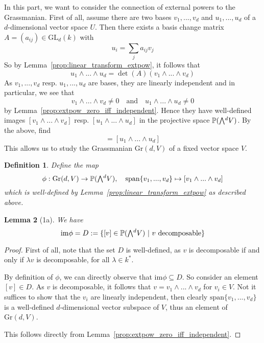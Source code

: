 \documentclass{scrartcl}
\newcommand{\Proj}{\mathbb{P}}
\newcommand{\GL}{\mathrm{GL}}
\newcommand{\Gr}{\mathrm{Gr}}
\newcommand{\extpow}{\mathchoice{{\textstyle\bigwedge}}
    {{\bigwedge}}
    {{\textstyle\wedge}}
    {{\scriptstyle\wedge}}}
\newcommand{\vspan}{\mathrm{span}}
\newtheorem{definition}{Definition}
\newtheorem{lemma}[definition]{Lemma}
\begin{document}
In this part, we want to consider the connection of external powers to the Grassmanian.
First of all, assume there are two bases $v_1, ..., v_d$ and $u_1, ..., u_d$ of a $d$-dimensional vector space $U$. 
Then there exists a basis change matrix $A = (a_{ij}) \in \GL_d(k)$ with
\begin{equation*}
    u_i = \sum_j a_{ij} v_j
\end{equation*}
So by Lemma~\ref{prop:linear_transform_extpow}, it follows that
\begin{equation*}
    u_1 \wedge ... \wedge u_d = \det(A) (v_1 \wedge ... \wedge v_d)
\end{equation*}
As $v_1, ..., v_d$ resp. $u_1, ..., u_d$ are bases, they are linearly independent and in particular, we see that
\begin{equation*}
    v_1 \wedge ... \wedge v_d \neq 0 \quad \text{and} \quad u_1 \wedge ... \wedge u_d \neq 0
\end{equation*}
by Lemma~\ref{prop:extpow_zero_iff_independent}.
Hence they have well-defined images $[v_1 \wedge ... \wedge v_d]$ resp. $[u_1 \wedge ... \wedge u_d]$ in the projective space $\Proj(\extpow^d V)$.
By the above, find
\begin{equation*}
    [v_1 \wedge ... \wedge v_d] = [u_1 \wedge ... \wedge u_d]
\end{equation*}
This allows us to study the Grassmanian $\Gr(d, V)$ of a fixed vector space $V$.
\begin{definition}
    Define the map
    \begin{equation*}
        \phi: \Gr(d, V) \to \Proj(\extpow^d V), \quad \vspan\{v_1, ..., v_d\} \mapsto [v_1 \wedge ... \wedge v_d]
    \end{equation*}
    which is well-defined by Lemma~\ref{prop:linear_transform_extpow} as described above.
\end{definition}
\begin{lemma}[1a]
    We have
    \begin{equation*}
        \mathrm{im}\phi = D := \{ [v] \in \Proj(\extpow^d V) \ | \ \text{$v$ decomposable}\}
    \end{equation*}
\end{lemma}
\begin{proof}
    First of all, note that the set $D$ is well-defined, as $v$ is decomposable if and only if $\lambda v$ is decomposable, for all $\lambda \in k^*$.

    By definition of $\phi$, we can directly observe that $\mathrm{im}\phi \subseteq D$.
    So consider an element $[v] \in D$.
    As $v$ is decomposable, it follows that $v = v_1 \wedge ... \wedge v_d$ for $v_i \in V$.
    Not it suffices to show that the $v_i$ are linearly independent, then clearly $\vspan\{v_1, ..., v_d\}$ is a well-defined $d$-dimensional vector subspace of $V$, thus an element of $\Gr(d, V)$.

    This follows directly from Lemma~\ref{prop:extpow_zero_iff_independent}.
\end{proof}
\end{document}
